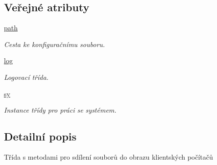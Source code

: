 \subsection*{Veřejné atributy}
\begin{DoxyCompactItemize}
\item 
\hypertarget{classShrFol_1_1ShrFol_a737b5cea5bb1aac9d1b0a995fd467507}{\hyperlink{classShrFol_1_1ShrFol_a737b5cea5bb1aac9d1b0a995fd467507}{path}}\label{d1/dce/classShrFol_1_1ShrFol_a737b5cea5bb1aac9d1b0a995fd467507}

\begin{DoxyCompactList}\small\item\em Cesta ke konfiguračnímu souboru. \end{DoxyCompactList}\item 
\hypertarget{classShrFol_1_1ShrFol_a9bc63352249879bda2954f8005ee5254}{\hyperlink{classShrFol_1_1ShrFol_a9bc63352249879bda2954f8005ee5254}{log}}\label{d1/dce/classShrFol_1_1ShrFol_a9bc63352249879bda2954f8005ee5254}

\begin{DoxyCompactList}\small\item\em Logovací třída. \end{DoxyCompactList}\item 
\hypertarget{classShrFol_1_1ShrFol_a1d8ffe5f8cdb2cb4d0a0fe4b0455e6ea}{\hyperlink{classShrFol_1_1ShrFol_a1d8ffe5f8cdb2cb4d0a0fe4b0455e6ea}{sy}}\label{d1/dce/classShrFol_1_1ShrFol_a1d8ffe5f8cdb2cb4d0a0fe4b0455e6ea}

\begin{DoxyCompactList}\small\item\em Instance třídy pro práci se systémem. \end{DoxyCompactList}\end{DoxyCompactItemize}


\subsection{Detailní popis}
Třída s metodami pro sdílení souborů do obrazu klientských počítačů 

